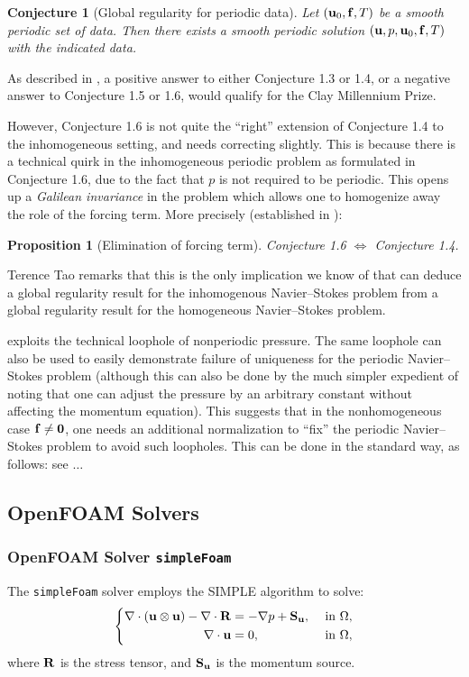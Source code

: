 \documentclass{article}
\numberwithin{equation}{section}
\newtheorem{proposition}{Proposition}[section]
\newtheorem{conjecture}{Conjecture}[section]
\begin{document}
\begin{conjecture}[Global regularity for periodic data]
	Let $({\bf u}_0,{\bf f},T)$ be a smooth periodic set of data. Then there exists a smooth periodic solution $({\bf u},p,{\bf u}_0,{\bf f},T)$ with the indicated data.
\end{conjecture}
As described in \cite{Fefferman2006}, a positive answer to either Conjecture 1.3 or 1.4, or a negative answer to Conjecture 1.5 or 1.6, would qualify for the Clay Millennium Prize.

However, Conjecture 1.6 is not quite the ``right'' extension of Conjecture 1.4 to the inhomogeneous setting, and needs correcting slightly. This is because there is a technical quirk in the inhomogeneous periodic problem as formulated in Conjecture 1.6, due to the fact that $p$ is not required to be periodic. This opens up a \textit{Galilean invariance} in the problem which allows one to homogenize away the role of the forcing term. More precisely (established in \cite[Sect. 6]{Tao2013}):

\begin{proposition}[Elimination of forcing term]
	Conjecture 1.6 $\Leftrightarrow$ Conjecture 1.4.
\end{proposition}
Terence Tao remarks that this is the only implication we know of that can deduce a global regularity result for the inhomogenous Navier--Stokes problem from a global regularity result for the homogeneous Navier--Stokes problem.

\cite[Prop. 1.7]{Tao2013} exploits the technical loophole of nonperiodic pressure. The same loophole can also be used to easily demonstrate failure of uniqueness for the periodic Navier--Stokes problem (although this can also be done by the much simpler expedient of noting that one can adjust the pressure by an arbitrary constant without affecting the momentum equation). This suggests that in the nonhomogeneous case ${\bf f}\ne{\bf 0}$, one needs an additional normalization to ``fix'' the periodic Navier--Stokes problem to avoid such loopholes. This can be done in the standard way, as follows: see \cite[p. 28]{Tao2013}$\ldots$

\subsection{OpenFOAM Solvers}

\subsubsection{OpenFOAM Solver \texttt{simpleFoam}}
The \texttt{simpleFoam} solver employs the SIMPLE algorithm to solve:
\begin{equation}
	\left\{\begin{split}
		\nabla\cdot({\bf u}\otimes{\bf u}) - \nabla\cdot{\bf R} &= -\nabla p + {\bf S}_{\bf u},&&\mbox{ in }\Omega,\\
		\nabla\cdot{\bf u} &= 0,&&\mbox{ in }\Omega,
	\end{split}\right.
\end{equation}
where ${\bf R}$ is the stress tensor, and ${\bf S}_{\bf u}$ is the momentum source.
\end{document}
